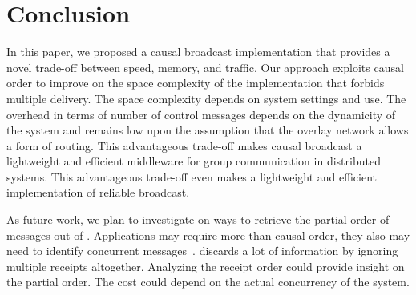 
\section{Conclusion}
\label{sec:conclusion}


In this paper, we proposed a causal broadcast implementation that provides a
novel trade-off between speed, memory, and traffic.  Our approach exploits
causal order to improve on the space complexity of the implementation that
forbids multiple delivery. The space complexity depends on system settings and
use. The overhead in terms of number of control messages depends on the
dynamicity of the system and remains low upon the assumption that the overlay
network allows a form of routing.
This advantageous trade-off makes causal broadcast a lightweight and efficient
middleware for group communication in distributed systems. This advantageous
trade-off even makes \RPCBROADCAST a lightweight and efficient implementation of
reliable broadcast. %

As future work, we plan to investigate on ways to retrieve the partial order of
messages out of \RPCBROADCAST. %
Applications may require more than causal order, they also may need to identify
concurrent messages~\cite{sun2009contextbased}. \RPCBROADCAST discards a lot of
information by ignoring multiple receipts altogether. Analyzing the receipt
order could provide insight on the partial order. The cost could depend on the
actual concurrency of the system.

